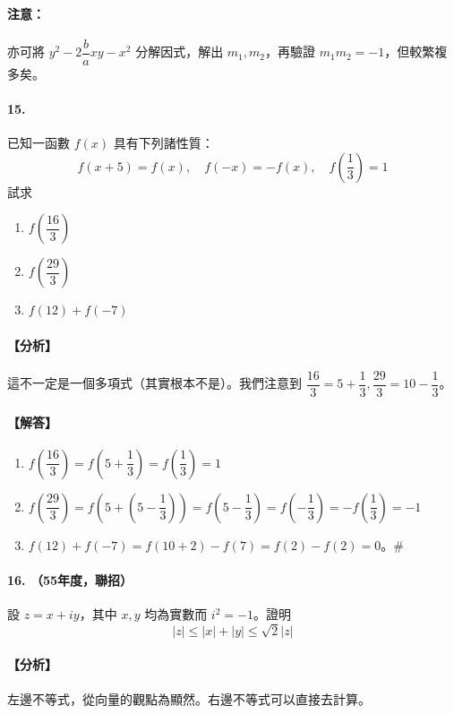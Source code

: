 \paragraph{注意：} 亦可將 $y^2-2\dfrac{b}{a}xy-x^2$ 分解因式，解出 $m_1, m_2$，再驗證 $m_1 m_2 = -1$，但較繁複多矣。

\paragraph{15.}
已知一函數 $f(x)$ 具有下列諸性質：
\[ f(x+5) = f(x), \quad f(-x) = -f(x), \quad f\left(\dfrac{1}{3}\right) = 1 \]
試求
\begin{enumerate}[label=(\alph*), leftmargin=2em]
  \item $f\left(\dfrac{16}{3}\right)$
  \item $f\left(\dfrac{29}{3}\right)$
  \item $f(12)+f(-7)$
\end{enumerate}

\paragraph{【分析】}
這不一定是一個多項式（其實根本不是）。我們注意到 $\dfrac{16}{3} = 5+\dfrac{1}{3}, \dfrac{29}{3} = 10-\dfrac{1}{3}$。

\paragraph{【解答】}
\begin{enumerate}[label=(\alph*), leftmargin=2em]
  \item $f\left(\dfrac{16}{3}\right) = f\left(5+\dfrac{1}{3}\right) = f\left(\dfrac{1}{3}\right) = 1$
  \item $f\left(\dfrac{29}{3}\right) = f\left(5+\left(5-\dfrac{1}{3}\right)\right) = f\left(5-\dfrac{1}{3}\right) = f\left(-\dfrac{1}{3}\right) = -f\left(\dfrac{1}{3}\right) = -1$
  \item $f(12)+f(-7) = f(10+2)-f(7) = f(2)-f(2) = 0$。\hfill$\#$
\end{enumerate}

\paragraph{16. （55年度，聯招）}
設 $z = x+iy$，其中 $x, y$ 均為實數而 $i^2 = -1$。證明
\[ |z| \le |x|+|y| \le \sqrt{2}|z| \]

\paragraph{【分析】}
左邊不等式，從向量的觀點為顯然。右邊不等式可以直接去計算。

